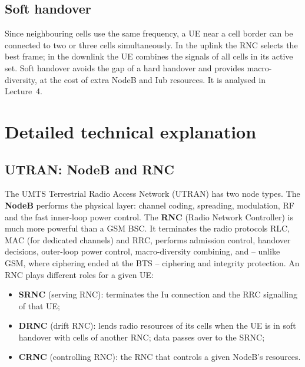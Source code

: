 \documentclass[11pt,a4paper]{article}
\begin{document}
\subsection{Soft handover}
Since neighbouring cells use the same frequency, a UE near a cell border can be connected to two
or three cells simultaneously. In the uplink the RNC selects the best frame; in the downlink the
UE combines the signals of all cells in its active set. Soft handover avoids the gap of a hard
handover and provides macro-diversity, at the cost of extra NodeB and Iub resources. It is
analysed in Lecture~4.

\section{Detailed technical explanation}

\subsection{UTRAN: NodeB and RNC}
The UMTS Terrestrial Radio Access Network (UTRAN) \cite{ts25401} has two node types.
The \textbf{NodeB} performs the physical layer: channel coding, spreading, modulation, RF and
the fast inner-loop power control. The \textbf{RNC} (Radio Network Controller) is much more
powerful than a GSM BSC. It terminates the radio protocols RLC, MAC (for dedicated channels)
and RRC, performs admission control, handover decisions, outer-loop power control, macro-diversity
combining, and -- unlike GSM, where ciphering ended at the BTS -- ciphering and integrity
protection. An RNC plays different roles for a given UE:
\begin{itemize}
  \item \textbf{SRNC} (serving RNC): terminates the Iu connection and the RRC signalling of that UE;
  \item \textbf{DRNC} (drift RNC): lends radio resources of its cells when the UE is in soft
        handover with cells of another RNC; data passes over  to the SRNC;
  \item \textbf{CRNC} (controlling RNC): the RNC that controls a given NodeB's resources.
\end{itemize}
\end{document}
